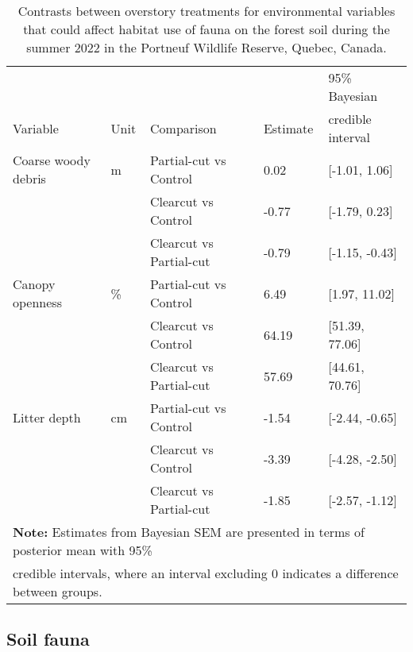 \begin{table}[ht]
  \centering
  \caption[Contrasts between overstory treatments for environmental variables that could affect habitat selection of fauna on the forest soil.]
  {Contrasts between overstory treatments for environmental variables that could affect habitat use of fauna on the forest soil during the summer 2022 in the Portneuf Wildlife Reserve,
  Quebec, Canada.}
  \label{tab:overstoryenvar}
  \begin{tabular}{lllll} 
      \hline
      &&&&95\% Bayesian \\
      Variable&Unit& Comparison & Estimate &  credible interval \\ [0.5ex] 
      \hline
      Coarse woody debris &m\up{3}& Partial-cut vs Control & \hspace{1mm}0.02 & [-1.01, 1.06] \\ 
                 && Clearcut vs Control  & -0.77 & [-1.79, 0.23] \\ 
                          && Clearcut vs Partial-cut  & -0.79 & [-1.15, -0.43] \\
      Canopy openness     &\%& Partial-cut vs Control & \hspace{1mm}6.49 & [1.97, 11.02] \\ 
                      && Clearcut vs Control  & \hspace{1mm}64.19 & [51.39, 77.06] \\ 
                          && Clearcut vs Partial-cut  & \hspace{1mm}57.69 & [44.61, 70.76] \\ 
      Litter depth        &cm& Partial-cut vs Control & -1.54 & [-2.44, -0.65] \\ 
                      && Clearcut vs Control  & -3.39 & [-4.28, -2.50] \\ 
                          && Clearcut vs Partial-cut  & -1.85 & [-2.57, -1.12] \\       
      \hline
      \multicolumn{5}{l}{\textbf{Note:} Estimates from Bayesian SEM are presented in terms of posterior mean with 95\%} \\
      \multicolumn{5}{l}{credible intervals, where an interval excluding 0 indicates a difference between groups.} \\
  \end{tabular}
\end{table}

\pagebreak


\subsection*{Soil fauna}
\label{subsec:taxa}

